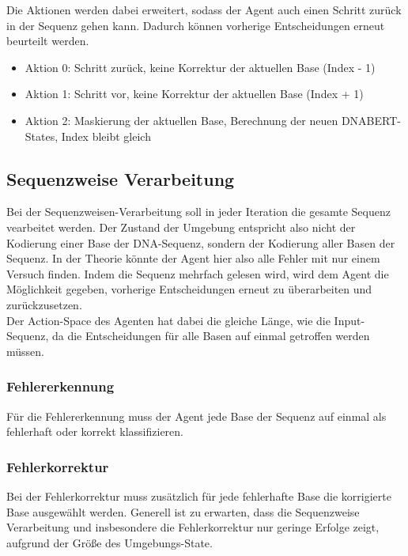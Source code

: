 \documentclass[oneside,bibliography=totocnumbered,BCOR=5mm]{scrbook}%
\theoremstyle{definition}
\theoremstyle{definition}
\theoremstyle{definition}
\theoremstyle{definition}
\theoremstyle{definition}
\theoremstyle{definition}
\begin{document}
Die Aktionen werden dabei erweitert, sodass der Agent auch einen Schritt zurück in der Sequenz gehen kann.
Dadurch können vorherige Entscheidungen erneut beurteilt werden.\\

\begin{itemize}
  \item Aktion 0: Schritt zurück, keine Korrektur der aktuellen Base (Index - 1)
  \item Aktion 1: Schritt vor, keine Korrektur der aktuellen Base  (Index + 1)
  \item Aktion 2: Maskierung der aktuellen Base, Berechnung der neuen DNABERT-States, Index bleibt gleich
\end{itemize}



\subsection{Sequenzweise Verarbeitung}
Bei der Sequenzweisen-Verarbeitung soll in jeder Iteration die gesamte Sequenz vearbeitet werden.
Der Zustand der Umgebung entspricht also nicht der Kodierung einer Base der DNA-Sequenz, sondern 
der Kodierung aller Basen der Sequenz. In der Theorie könnte der Agent hier also alle Fehler mit nur einem Versuch finden.
Indem die Sequenz mehrfach gelesen wird, wird dem Agent die Möglichkeit gegeben, vorherige Entscheidungen 
erneut zu überarbeiten und zurückzusetzen.\\

Der Action-Space des Agenten hat dabei die gleiche Länge, wie die Input-Sequenz, da die Entscheidungen
für alle Basen auf einmal getroffen werden müssen.
\subsubsection{Fehlererkennung}
Für die Fehlererkennung muss der Agent jede Base der Sequenz auf einmal als fehlerhaft oder korrekt klassifizieren.
\subsubsection{Fehlerkorrektur}
Bei der Fehlerkorrektur muss zusätzlich für jede fehlerhafte Base die korrigierte Base ausgewählt werden.
Generell ist zu erwarten, dass die Sequenzweise Verarbeitung und insbesondere die Fehlerkorrektur nur geringe
Erfolge zeigt, aufgrund der Größe des Umgebungs-State.



\clearpage
\end{document}
